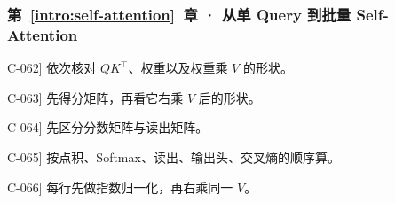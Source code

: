 \subsubsection*{第~\ref*{intro:self-attention}~章 · 从单 Query 到批量 Self-Attention}
\begin{answerhints}
\item[\hyperref[exercise:attention-shapes]{C-062}] \leavevmode{}\label{hint:attention-shapes}依次核对 $QK^\top$、权重以及权重乘 $V$ 的形状。
\item[\hyperref[exercise:cross-attention-shapes]{C-063}] \leavevmode{}\label{hint:cross-attention-shapes}先得分矩阵，再看它右乘 $V$ 后的形状。
\item[\hyperref[exercise:score-value-confusion]{C-064}] \leavevmode{}\label{hint:score-value-confusion}先区分分数矩阵与读出矩阵。
\item[\hyperref[exercise:attention-loss-transfer]{C-065}] \leavevmode{}\label{hint:attention-loss-transfer}按点积、Softmax、读出、输出头、交叉熵的顺序算。
\item[\hyperref[exercise:batch-softmax-recompute]{C-066}] \leavevmode{}\label{hint:batch-softmax-recompute}每行先做指数归一化，再右乘同一 $V$。
\end{answerhints}
